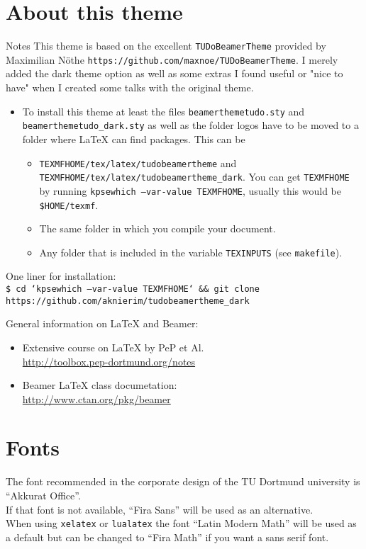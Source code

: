 \section{About this theme}
\begin{frame}{Notes}
  This theme is based on the excellent \texttt{TUDoBeamerTheme} provided by Maximilian Nöthe \texttt{https://github.com/maxnoe/TUDoBeamerTheme}.
  I merely added the dark theme option as well as some extras I found useful or "nice to have" when I created some talks with the original theme.
  \begin{itemize}
    \item To install this theme at least the files \texttt{beamerthemetudo.sty} and \texttt{beamerthemetudo\_dark.sty} as well as the folder logos have to be moved to a folder where \LaTeX{} can find packages.
      This can be
      \begin{itemize}
        \item \texttt{TEXMFHOME/tex/latex/tudobeamertheme} and \texttt{TEXMFHOME/tex/latex/tudobeamertheme\_dark}. You can get \texttt{TEXMFHOME} by running \texttt{kpsewhich --var-value TEXMFHOME}, usually this would be \texttt{\$HOME/texmf}.
        \item The same folder in which you compile your document.
        \item Any folder that is included in the variable \texttt{TEXINPUTS} (see \texttt{makefile}).
      \end{itemize}
  \end{itemize}

  One liner for installation:\\
  \texttt{\footnotesize\$ cd `kpsewhich --var-value TEXMFHOME` \&\& git clone https://github.com/aknierim/tudobeamertheme\_dark}

  \medskip
  General information on \LaTeX{} and Beamer:
  \begin{itemize}
    \item Extensive course on \LaTeX{} by PeP et Al. \\
      \url{http://toolbox.pep-dortmund.org/notes}
    \item Beamer \LaTeX{} class documetation:\\
      \url{http://www.ctan.org/pkg/beamer}
  \end{itemize}
\end{frame}


\section{Fonts}
\begin{frame}
  The font recommended in the corporate design of the TU Dortmund university
  is \enquote{Akkurat Office}.\\
  \bigskip
  If that font is not available, \enquote{Fira Sans} will be used as an alternative.\\
  \bigskip
  When using \texttt{xelatex} or \texttt{lualatex} the font \enquote{Latin Modern Math}
  will be used as a default but can be changed to \enquote{Fira Math} if you want a
  sans serif font.
\end{frame}





